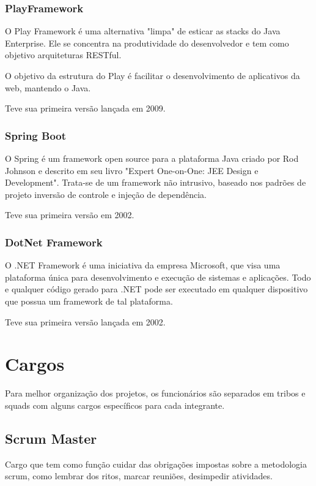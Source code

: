 \subsubsection{PlayFramework}

O Play Framework é uma alternativa "limpa" de esticar as stacks do Java Enterprise. Ele se concentra na produtividade do desenvolvedor e tem como objetivo arquiteturas RESTful. 

O objetivo da estrutura do Play é facilitar o desenvolvimento de aplicativos da web, mantendo o Java.

Teve sua primeira versão lançada em 2009.

\subsubsection{Spring Boot}

O Spring é um framework open source para a plataforma Java criado por Rod Johnson e descrito em seu livro "Expert One-on-One: JEE Design e Development".
Trata-se de um framework não intrusivo, baseado nos padrões de projeto inversão de controle e injeção de dependência.

Teve sua primeira versão em 2002.

\subsubsection{DotNet Framework}

O .NET Framework é uma iniciativa da empresa Microsoft, que visa uma plataforma única para desenvolvimento e execução de sistemas e aplicações.
Todo e qualquer código gerado para .NET pode ser executado em qualquer dispositivo que possua um framework de tal plataforma.

Teve sua primeira versão lançada em 2002.

\section{Cargos}

Para melhor organização dos projetos, os funcionários são separados em tribos e squads com alguns cargos específicos para cada integrante.

\subsection{Scrum Master}

Cargo que tem como função cuidar das obrigações impostas sobre a metodologia scrum, como lembrar dos ritos, marcar reuniões, desimpedir atividades.

